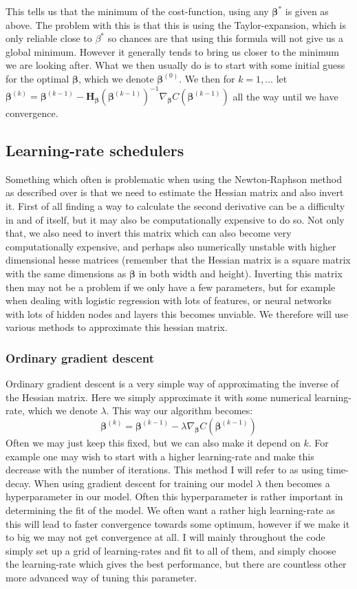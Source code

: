 \documentclass{article}
\begin{document}
This tells us that the minimum of the cost-function, using any $\bm{\beta}^*$ is
given as above. The problem with this is that this is using the
Taylor-expansion, which is only reliable close to $\beta^*$ so chances are that
using this formula will not give us a global minimum. However it generally tends
to bring us closer to the minimum we are looking after. What we then usually do
is to start with some initial guess for the optimal $\bm{\beta}$, which we
denote $\bm{\beta}^{(0)}$. We then for $k=1, \dots$ let $\bm{\beta}^{(k)} =
    \bm{\beta}^{(k-1)} - \bm{H}_{\bm{\beta}}(\bm{\beta}^{(k-1)})^{-1}
    \nabla_{\bm{\beta}} C(\bm{\beta}^{(k-1)})$ all the way until we have convergence.

\subsection{Learning-rate schedulers}
Something which often is problematic when using the Newton-Raphson method as
described over is that we need to estimate the Hessian matrix and also invert
it. First of all finding a way to calculate the second derivative can be a
difficulty in and of itself, but it may also be computationally expensive to do
so. Not only that, we also need to invert this matrix which can also become very
computationally expensive, and perhaps also numerically unstable with higher
dimensional hesse matrices (remember that the Hessian matrix is a square matrix
with the same dimensions as $\bm{\beta}$ in both width and height).  Inverting
this matrix then may not be a problem if we only have a few parameters, but for
example when dealing with logistic regression with lots of features, or neural
networks with lots of hidden nodes and layers this becomes unviable. We
therefore will use various methods to approximate this hessian matrix.

\subsubsection{Ordinary gradient descent}
Ordinary gradient descent is a very simple way of approximating the inverse of
the Hessian matrix. Here we simply approximate it with some numerical
learning-rate, which we denote $\lambda$. This way our algorithm becomes:
$$\bm{\beta}^(k) = \bm{\beta}^{(k-1)} - \lambda \nabla_{\bm{\beta}} C(\bm{\beta}^{(k-1)})$$
Often we may just keep this fixed, but we can also make it depend on $k$. For
example one may wish to start with a higher learning-rate and make this decrease
with the number of iterations. This method I will refer to as using time-decay.
When using gradient descent for training our model $\lambda$ then becomes a
hyperparameter in our model. Often this hyperparameter is rather important in
determining the fit of the model. We often want a rather high learning-rate as
this will lead to faster convergence towards some optimum, however if we make it
to big we may not get convergence at all. I will mainly throughout the code
simply set up a grid of learning-rates and fit to all of them, and simply choose
the learning-rate which gives the best performance, but there are countless
other more advanced way of tuning this parameter.
\end{document}
